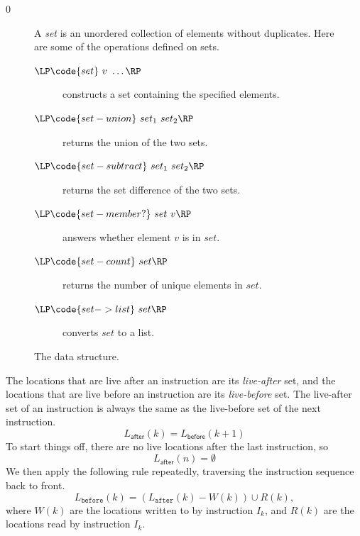 \documentclass[7x10]{TimesAPriori_MIT}%
\def\racketEd{0}
\providecommand{\BookEdition}{1}
\let\edition\BookEdition
\numberwithin{theorem}{chapter}
\numberwithin{definition}{chapter}
\numberwithin{equation}{chapter}
\begin{document}
{\if\edition\racketEd
\begin{figure}[tp]
  \small
  \begin{tcolorbox}[title=\href{https://docs.racket-lang.org/reference/sets.html}{The Racket Set Package}]
    A \emph{set} is an unordered collection of elements without duplicates.
    Here are some of the operations defined on sets.
  \begin{description}
  \item[$\LP\code{set}~v~\ldots\RP$] constructs a set containing the specified elements.
  \item[$\LP\code{set-union}~set_1~set_2\RP$] returns the union of the two sets.
  \item[$\LP\code{set-subtract}~set_1~set_2\RP$] returns the set
    difference of the two sets.
  \item[$\LP\code{set-member?}~set~v\RP$] answers whether element $v$ is in $set$.
  \item[$\LP\code{set-count}~set\RP$] returns the number of unique elements in $set$.
  \item[$\LP\code{set->list}~set\RP$] converts $set$ to a list.
  \end{description}
  \end{tcolorbox}
  \caption{The  data structure.}
  \label{fig:set}
\end{figure}
\fi}


The locations that are live after an instruction are its
\emph{live-after} set, and the locations
that are live before an instruction are its
\emph{live-before} set. The live-after
set of an instruction is always the same as the live-before set of the
next instruction.
\begin{equation} \label{eq:live-after-before-next}
  L_{\mathsf{after}}(k) = L_{\mathsf{before}}(k+1)
\end{equation}
To start things off, there are no live locations after the last
instruction, so
\begin{equation}\label{eq:live-last-empty}
  L_{\mathsf{after}}(n) = \emptyset
\end{equation}
We then apply the following rule repeatedly, traversing the
instruction sequence back to front.
\begin{equation}\label{eq:live-before-after-minus-writes-plus-reads}
  L_{\mathtt{before}}(k) = (L_{\mathtt{after}}(k) - W(k)) \cup R(k),
\end{equation}
where $W(k)$ are the locations written to by instruction $I_k$, and
$R(k)$ are the locations read by instruction $I_k$.
\end{document}
